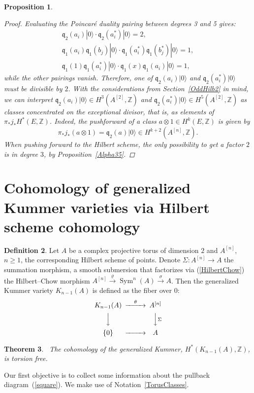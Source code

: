 \documentclass{alggeom}
\DeclareMathOperator{\Sym}{Sym}
\renewcommand{\rho}{\varrho}
\newcommand{\hilb}[1]{^{[#1]}}
\newcommand{\vac}{|0\rangle}
\newcommand{\q}{\mathfrak{q}}
\newcommand{\kum}[2]{K_{ #2 }( #1 )}
\newcommand{\Z}{\mathbb{Z}}
\theoremstyle{plain}
\newtheorem{theorem}{Theorem}[section]
\newtheorem{proposition}[theorem]{Proposition}
\theoremstyle{definition}
\newtheorem{definition}[theorem]{Definition}
\theoremstyle{remark}
\begin{document}
\begin{proposition}
\begin{proof}
Evaluating the Poincar\'e duality pairing between degrees 3 and 5 gives:
\begin{gather*}
 \q_2(a_i)\vac \cdot \q_2(a^*_i)\vac = 2, \\
 \q_1(a_i)\q_1(b_j)\vac \cdot  \q_1(a^*_i)\q_1(b^*_j)\vac = 1, \\
 \q_1(1)\q_1(a^*_i)\vac \cdot \q_1(x)\q_1(a_i)\vac = 1,
\end{gather*}
while the other pairings vanish. Therefore, one of $\q_2(a_i)\vac$ and $\q_2(a^*_i)\vac$ must be divisible by $2$. 
With the considerations from Section~\ref{OddHilb2} in mind, we can interpret $\q_2(a_i)\vac\in H^3(A\hilb{2},\Z)$ and $\q_2(a^*_i)\vac\in H^5(A\hilb{2},\Z)$ as classes concentrated on the exceptional divisor, that is, as elements of $\pi_* j_*H^*(E,\Z)$. Indeed,
the pushforward of a class $a\otimes 1 \in H^{k}(E,\Z)$ is given by 
$$
\pi_* j_*(a\otimes 1) = \q_2(a)\vac \in H^{k+2}(A\hilb{n},\Z).
$$
When pushing forward to the Hilbert scheme, the only possibility to get a factor $2$ is in degree $3$, by Proposition~\ref{Alpha35}. 
\end{proof}

\end{proposition}

\section[Generalized Kummer varieties and the morphism to the Hilbert scheme]{Cohomology of generalized Kummer varieties via Hilbert scheme cohomology %
}
\label{Section_GeneralKummer}
\begin{definition}
Let $A$ be a complex projective torus of dimension $2$ and $A\hilb{n}$, $n\geq 1$, the corresponding Hilbert scheme of points. Denote $\Sigma : A\hilb{n} \rightarrow A$ the summation morphism, a smooth submersion that factorizes via (\ref{HilbertChow}) the Hilbert--Chow morphism $A\hilb{n}\stackrel{\rho}{\rightarrow}\Sym^n(A)\stackrel{\sigma}{\rightarrow} A$. Then the generalized Kummer variety $\kum{A}{n-1}$ is defined as the fiber over $0$:
\begin{equation}\label{square}
\begin{CD}
\kum{A}{n-1} @>\theta >> A\hilb{n}\\
@VVV @VV\Sigma V\\
\{0\} @> >> A
\end{CD}
\end{equation}
\end{definition}
\begin{theorem}~\cite[Theorem 2]{Spanier}\label{torsion}
The cohomology of the generalized Kummer, $H^*(\kum{A}{n-1},\Z)$, is torsion free. 
\end{theorem}
Our first objective is to collect some information about the pullback diagram~(\ref{square}). 
We make use of Notation~\ref{TorusClasses}.
\end{document}

